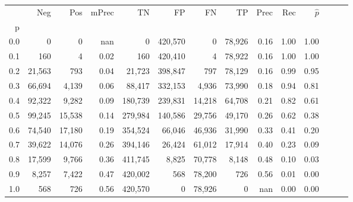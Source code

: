 \begin{tabular}{rrrrrrrrrrrrrr}
\toprule
{} &     Neg &     Pos & mPrec &       TN &       FP &      FN &      TP &  Prec &   Rec & $\hat{p}$ \\
p   &         &         &       &          &          &         &         &       &       &           \\
\midrule
0.0 &       0 &       0 &   nan &        0 &  420,570 &       0 &  78,926 &  0.16 &  1.00 &      1.00 \\
0.1 &     160 &       4 &  0.02 &      160 &  420,410 &       4 &  78,922 &  0.16 &  1.00 &      1.00 \\
0.2 &  21,563 &     793 &  0.04 &   21,723 &  398,847 &     797 &  78,129 &  0.16 &  0.99 &      0.95 \\
0.3 &  66,694 &   4,139 &  0.06 &   88,417 &  332,153 &   4,936 &  73,990 &  0.18 &  0.94 &      0.81 \\
0.4 &  92,322 &   9,282 &  0.09 &  180,739 &  239,831 &  14,218 &  64,708 &  0.21 &  0.82 &      0.61 \\
0.5 &  99,245 &  15,538 &  0.14 &  279,984 &  140,586 &  29,756 &  49,170 &  0.26 &  0.62 &      0.38 \\
0.6 &  74,540 &  17,180 &  0.19 &  354,524 &   66,046 &  46,936 &  31,990 &  0.33 &  0.41 &      0.20 \\
0.7 &  39,622 &  14,076 &  0.26 &  394,146 &   26,424 &  61,012 &  17,914 &  0.40 &  0.23 &      0.09 \\
0.8 &  17,599 &   9,766 &  0.36 &  411,745 &    8,825 &  70,778 &   8,148 &  0.48 &  0.10 &      0.03 \\
0.9 &   8,257 &   7,422 &  0.47 &  420,002 &      568 &  78,200 &     726 &  0.56 &  0.01 &      0.00 \\
1.0 &     568 &     726 &  0.56 &  420,570 &        0 &  78,926 &       0 &   nan &  0.00 &      0.00 \\
\bottomrule
\end{tabular}
